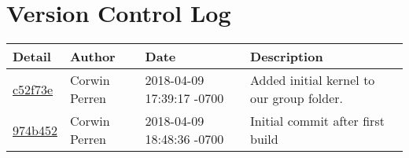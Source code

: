 \section{Version Control Log}
\begin{center}
\begin{tabular}{l l l l}	\textbf{Detail} & \textbf{Author} & \textbf{Date} &\textbf{Description}\\\hline

\href{commit/c52f73e00546af6f3fe60b23584aeb9c598db667}{c52f73e} & Corwin Perren & 2018-04-09 17:39:17 -0700 &Added initial kernel to our group folder.\\\hline
\href{commit/974b4529f98f277120295937f6491675832c97bc}{974b452} & Corwin Perren & 2018-04-09 18:48:36 -0700 &Initial commit after first build\\\hline


\end{tabular}
\end{center}